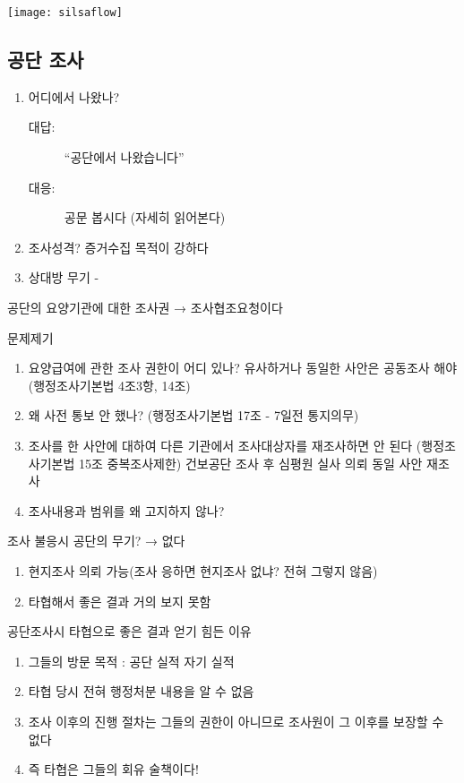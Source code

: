 \texttt{[image: silsaflow]}

\subsection{공단 조사}
\begin{enumerate}[1.]\tightlist
\item 어디에서 나왔나?
	\begin{description}
	\item[대답:] ``공단에서 나왔습니다”
	\item[대응:] 공문 봅시다  (자세히 읽어본다)
	\end{description}
\item 조사성격? 증거수집 목적이 강하다
\item 상대방 무기 - 
\end{enumerate}
공단의 요양기관에 대한 조사권  → 조사협조요청이다 \par

문제제기
 \begin{enumerate}[1)]\tightlist
 \item 요양급여에 관한 조사 권한이 어디 있나? 유사하거나 동일한 사안은 공동조사 해야(행정조사기본법 4조3항, 14조)
 \item 왜 사전 통보 안 했나? (행정조사기본법  17조 - 7일전 통지의무)
 \item 조사를 한 사안에 대하여 다른 기관에서 조사대상자를 재조사하면 안 된다 (행정조사기본법 15조 중복조사제한) 건보공단 조사 후 심평원 실사 의뢰 동일 사안 재조사
 \item 조사내용과 범위를 왜 고지하지 않나?
 \end{enumerate}
    
 조사 불응시 공단의 무기? → 없다
 \begin{enumerate}[1)]\tightlist
 \item 현지조사 의뢰 가능(조사 응하면 현지조사 없냐? 전혀 그렇지 않음)
 \item 타협해서 좋은 결과 거의 보지 못함 
 \end{enumerate}

공단조사시 타협으로 좋은 결과 얻기 힘든 이유 
\begin{enumerate}[1)]\tightlist
\item 그들의 방문 목적 : 공단 실적        자기 실적
\item 타협 당시 전혀 행정처분 내용을 알 수 없음
\item 조사 이후의 진행 절차는 그들의 권한이 아니므로 조사원이 그 이후를 보장할 수 없다 
\item 즉 타협은 그들의 회유 술책이다!  
\end{enumerate}

